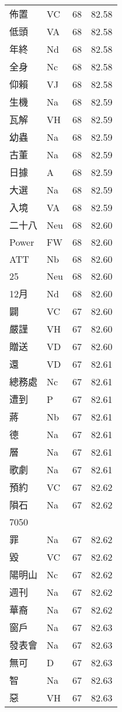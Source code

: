 \documentclass[twocolumn]{book}
\begin{document}
\begin{supertabular}{llrr}
佈置 & VC & 68 &  82.58\\
低頭 & VA & 68 &  82.58\\
年終 & Nd & 68 &  82.58\\
全身 & Nc & 68 &  82.58\\
仰賴 & VJ & 68 &  82.58\\
生機 & Na & 68 &  82.59\\
瓦解 & VH & 68 &  82.59\\
幼蟲 & Na & 68 &  82.59\\
古董 & Na & 68 &  82.59\\
日據 & A & 68 &  82.59\\
大選 & Na & 68 &  82.59\\
入境 & VA & 68 &  82.59\\
二十八 & Neu & 68 &  82.60\\
Power & FW & 68 &  82.60\\
ATT & Nb & 68 &  82.60\\
25 & Neu & 68 &  82.60\\
12月 & Nd & 68 &  82.60\\
闢 & VC & 67 &  82.60\\
嚴謹 & VH & 67 &  82.60\\
贈送 & VD & 67 &  82.60\\
還 & VD & 67 &  82.61\\
總務處 & Nc & 67 &  82.61\\
遭到 & P & 67 &  82.61\\
蔣 & Nb & 67 &  82.61\\
德 & Na & 67 &  82.61\\
層 & Na & 67 &  82.61\\
歌劇 & Na & 67 &  82.61\\
預約 & VC & 67 &  82.62\\
隕石 & Na & 67 &  82.62\\
7050\\
罪 & Na & 67 &  82.62\\
毀 & VC & 67 &  82.62\\
陽明山 & Nc & 67 &  82.62\\
週刊 & Na & 67 &  82.62\\
華裔 & Na & 67 &  82.62\\
窗戶 & Na & 67 &  82.63\\
發表會 & Na & 67 &  82.63\\
無可 & D & 67 &  82.63\\
智 & Na & 67 &  82.63\\
惡 & VH & 67 &  82.63\\

\end{supertabular}
\end{document}
